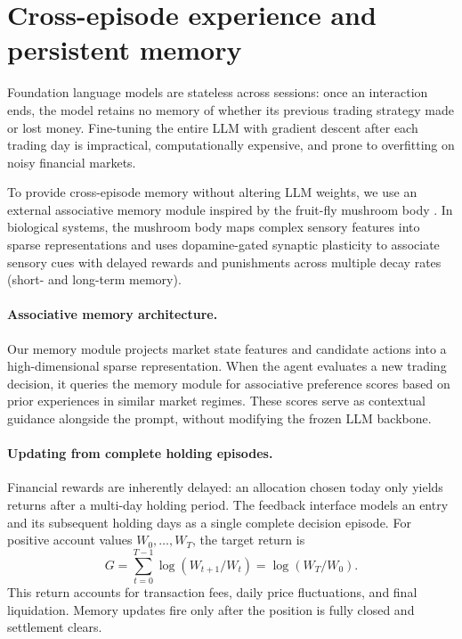 \section{Cross-episode experience and persistent memory}
\label{sec:fly}
Foundation language models are stateless across sessions: once an interaction ends,
the model retains no memory of whether its previous trading strategy made or lost money.
Fine-tuning the entire LLM with gradient descent after each trading day is impractical,
computationally expensive, and prone to overfitting on noisy financial markets.

To provide cross-episode memory without altering LLM weights, we use an external
associative memory module inspired by the fruit-fly mushroom body \cite{huang2024memory}.
In biological systems, the mushroom body maps complex sensory features into sparse
representations and uses dopamine-gated synaptic plasticity to associate sensory cues
with delayed rewards and punishments across multiple decay rates (short- and long-term
memory).

\paragraph{Associative memory architecture.}
Our memory module projects market state features and candidate actions into a high-dimensional
sparse representation. When the agent evaluates a new trading decision, it queries the
memory module for associative preference scores based on prior experiences in similar
market regimes. These scores serve as contextual guidance alongside the prompt, without
modifying the frozen LLM backbone.

\paragraph{Updating from complete holding episodes.}
Financial rewards are inherently delayed: an allocation chosen today only yields returns
after a multi-day holding period. The feedback interface models an entry and its subsequent
holding days as a single complete decision episode. For positive account values
$W_0,\ldots,W_T$, the target return is
\begin{equation}
G = \sum_{t=0}^{T-1}\log(W_{t+1}/W_t)
  = \log(W_T/W_0).
\end{equation}
This return accounts for transaction fees, daily price fluctuations, and final liquidation.
Memory updates fire only after the position is fully closed and settlement clears.

